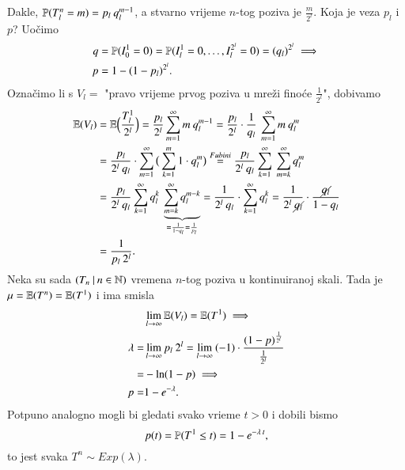\begin{pr}
    Dakle, $\mathbb{P}({T_l^n = m}) = p_l \: q_l^{m - 1}$, a stvarno vrijeme $n$-tog poziva je $\frac{m}{2^l}$.
    Koja je veza $p_l$ i $p$?
    Uo\v cimo
    \begin{equation*}
        \begin{aligned}
            q &= \mathbb{P}({I_0^1 = 0}) = \mathbb{P}({I_l^1 = 0, \ldots, I_l^{2^l} = 0}) = (q_l)^{2^l} \implies\\
            p &= 1 - (1 - p_l)^{2^l}.
        \end{aligned}
    \end{equation*}
    Ozna\v cimo li s $V_l =$ "pravo vrijeme prvog poziva u mre\v zi fino\' ce $\frac{1}{2^l}$", dobivamo
    \begin{equation*}
        \begin{aligned}
            \mathbb{E} (V_l) &= \mathbb{E} \Big(\frac{T_l^1}{2^l} \Big) = \frac{p_l}{2^l} \sum\limits_{m = 1}^{\infty} m \: q_l^{m - 1} = \frac{p_l}{2^l} \cdot \frac{1}{q_l} \: \sum\limits_{m = 1}^{\infty} m \: q_l^m\\
            &= \frac{p_l}{2^l \: q_l} \cdot \sum\limits_{m = 1}^{\infty} \big( \sum\limits_{k = 1}^{m} 1 \cdot q_l^m \big) \overset{Fubini}{=} \frac{p_l}{2^l \: q_l} \sum\limits_{k = 1}^{\infty} \: \sum\limits_{m = k}^{\infty} q_l^m\\
            &= \frac{p_l}{2^l \: q_l} \sum\limits_{k = 1}^{\infty} q_l^k \: \underbrace{\sum\limits_{m = k}^{\infty} q_l^{m - k}}_{= \frac{1}{1-q_l} = \frac{1}{p_l}} = \frac{1}{2^l \: q_l} \cdot \sum\limits_{k = 1}^{\infty} q_l^k = \frac{1}{2^l \: \cancel{q_l}} \cdot \frac{\cancel{q_l}}{1 - q_l}\\
            &= \frac{1}{p_l \: 2^l}.
        \end{aligned}
    \end{equation*}
    Neka su sada $({T_n} \: | \: {n \in \mathbb{N}})$ vremena $n$-tog poziva u kontinuiranoj skali.
    Tada je $\mu = \mathbb{E} (T^n) = \mathbb{E} (T^1)$ i ima smisla
    \begin{equation*}
        \begin{aligned}
            & \lim\limits_{l \to \infty} \mathbb{E} (V_l) = \mathbb{E} (T^1) \implies \\
            \lambda = & \lim\limits_{l \to \infty} p_l \: 2^l = \lim\limits_{l \to \infty} \: (-1) \cdot \frac{(1-p)^{\frac{1}{2^l}}}{\frac{1}{2^l}}\\
            = & - \ln (1 - p) \implies\\
            p =& 1 - e^{-\lambda}.
        \end{aligned}
    \end{equation*}
    Potpuno analogno mogli bi gledati svako vrieme $t>0$ i dobili bismo
    \begin{equation*}
        p(t) = \mathbb{P}({T^1 \leq t}) = 1 - e^{- \lambda \: t},
    \end{equation*}
    to jest svaka $T^n \sim Exp(\lambda)$.


\end{pr}

